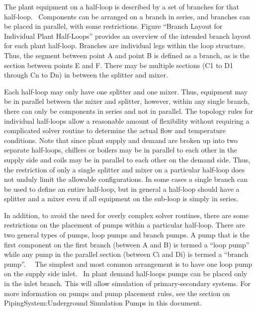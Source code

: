 The plant equipment on a half-loop is described by a set of branches for that half-loop.~ Components can be arranged on a branch in series, and branches can be placed in parallel, with some restrictions. Figure ``Branch Layout for Individual Plant Half-Loops'' provides an overview of the intended branch layout for each plant half-loop. Branches are individual legs within the loop structure. Thus, the segment between point A and point B is defined as a branch, as is the section between points E and F. There may be multiple sections (C1 to D1 through Cn to Dn) in between the splitter and mixer.

Each half-loop may only have one splitter and one mixer. Thus, equipment may be in parallel between the mixer and splitter, however, within any single branch, there can only be components in series and not in parallel. The topology rules for individual half-loops allow a reasonable amount of flexibility without requiring a complicated solver routine to determine the actual flow and temperature conditions. Note that since plant supply and demand are broken up into two separate half-loops, chillers or boilers may be in parallel to each other in the supply side and coils may be in parallel to each other on the demand side. Thus, the restriction of only a single splitter and mixer on a particular half-loop does not unduly limit the allowable configurations. In some cases a single branch can be used to define an entire half-loop, but in general a half-loop should have a splitter and a mixer even if all equipment on the sub-loop is simply in series.

In addition, to avoid the need for overly complex solver routines, there are some restrictions on the placement of pumps within a particular half-loop. There are two general types of pumps, loop pumps and branch pumps. A pump that is the first component on the first branch (between A and B) is termed a ``loop pump'' while any pump in the parallel section (between Ci and Di) is termed a ``branch pump''.~~ The simplest and most common arrangement is to have one loop pump on the supply side inlet.~ In plant demand half-loops pumps can be placed only in the inlet branch. This will allow simulation of primary-secondary systems. For more information on pumps and pump placement rules, see the section on PipingSystem:Underground Simulation Pumps in this document.

